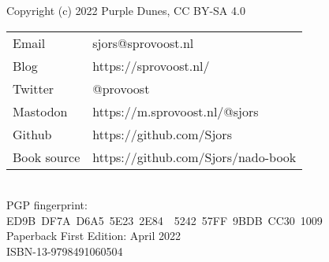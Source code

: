 {\setlength{\parindent}{0cm}
Copyright (c) 2022 Purple Dunes, CC BY-SA 4.0\\

\begin{tabular}{@{} l l }
Email & sjors@sprovoost.nl \\
Blog & https://sprovoost.nl/ \\
Twitter & @provoost \\
Mastodon & https://m.sprovoost.nl/@sjors \\
Github & https://github.com/Sjors \\
Book source & https://github.com/Sjors/nado-book \\
\end{tabular}
\\

PGP fingerprint:\\
ED9B DF7A D6A5 5E23 2E84  5242 57FF 9BDB CC30 1009\\

Paperback First Edition: April 2022\\

ISBN-13-9798491060504\\
}
\newpage
